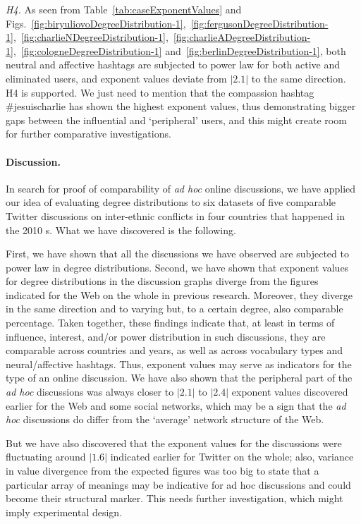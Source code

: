 \textit{H4.} As seen from Table~\cref{tab:caseExponentValues} and  Figs.~\cref{fig:biryuliovoDegreeDistribution-1},~\cref{fig:fergusonDegreeDistribution-1},~\cref{fig:charlieNDegreeDistribution-1},~\cref{fig:charlieADegreeDistribution-1},~\cref{fig:cologneDegreeDistribution-1} and~\cref{fig:berlinDegreeDistribution-1}, both neutral and affective hashtags are subjected to power law for both active and eliminated users, and exponent values deviate from \(\lvert2.1\rvert\) to the same direction. H4 is supported. We just need to mention that the compassion hashtag \#jesuischarlie has shown the highest exponent values, thus demonstrating bigger gaps between the influential and ‘peripheral’ users, and this might create room for further comparative investigations.

\paragraph{Discussion.} In search for proof of comparability of \textit{ad hoc} online discussions, we have applied our idea of evaluating degree distributions to six datasets of five comparable Twitter discussions on inter-ethnic conflicts in four countries that happened in the 2010 s. What we have discovered is the following.

First, we have shown that all the discussions we have observed are subjected to power law in degree distributions. Second, we have shown that exponent values for degree distributions in the discussion graphs diverge from the figures indicated for the Web on the whole in previous research. Moreover, they diverge in the same direction and to varying but, to a certain degree, also comparable percentage. Taken together, these findings indicate that, at least in terms of influence, interest, and/or power distribution in such discussions, they are comparable across countries and years, as well as across vocabulary types and neural/affective hashtags. Thus, exponent values may serve as indicators for the type of an online discussion. We have also shown that the peripheral part of the \textit{ad hoc} discussions was always closer to \(\lvert2.1\rvert\) to \(\lvert2.4\rvert\) exponent values discovered earlier for the Web and some social networks, which may be a sign that the \textit{ad hoc} discussions do differ from the ‘average’ network structure of the Web.

But we have also discovered that the exponent values for the discussions were fluctuating around \(\lvert1.6\rvert\) indicated earlier for Twitter on the whole; also, variance in value divergence from the expected figures was too big to state that a particular array of meanings may be indicative for ad hoc discussions and could become their structural marker. This needs further investigation, which might imply experimental design.

